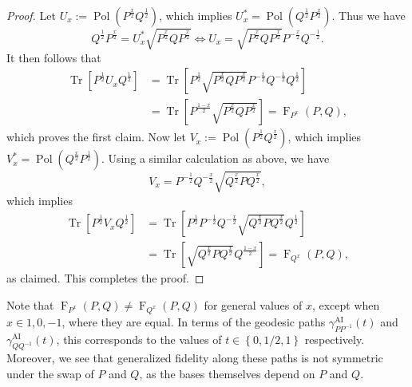 \documentclass[12pt]{article}
\theoremstyle{definition}
\newcommand{\Fg}[3]{\operatorname{F}_{#3}\!\left(#1, #2\right)}
\begin{document}
\begin{proof}
    Let $U_x := \operatorname{Pol}\left(P^\frac x2 Q ^{\frac12} \right)$, which implies $U_x^* = \operatorname{Pol}\left(Q ^{\frac12} P^\frac x2  \right)$. Thus we have
    \begin{equation}
        Q ^{\frac12} P^\frac{x}{2} = U_x^* \sqrt{P ^\frac x2 Q  P ^\frac x2} \iff U  _x  = \sqrt{P ^\frac x2 Q  P ^\frac x2  } P^{-\frac{x}{2}} Q ^{-\frac12}. 
    \end{equation}
   It then follows that
   \begin{equation}
    \begin{aligned}
       \operatorname{Tr}\left[P^{\frac12}  U_x Q ^{\frac12} \right] &= \operatorname{Tr}\left[P^{\frac12}  \sqrt{P ^\frac x2 Q  P ^\frac x2  } P^{-\frac{x}{2}} Q ^{-\frac12} Q ^{\frac12} \right] \\ &= \operatorname{Tr}\left[P^{\frac{1-x}2} \sqrt{P ^\frac x2 Q  P ^\frac x2} \right] = \Fg{P}{Q}{P^x},
    \end{aligned}
   \end{equation}
   which proves the first claim. Now let $V_x := \operatorname{Pol}\left(P^{\frac12}  Q^\frac{x}{2}\right)$, which implies $V_x^* = \operatorname{Pol}\left( Q^\frac x2 P^{\frac12} \right)$. Using a similar calculation as above, we have
    \begin{equation}
         V_x =  P ^{-\frac12} Q^{-\frac{x}2} \sqrt{Q^\frac x2 P Q^\frac x2} , 
    \end{equation}
    which implies
    \begin{equation}
    \begin{aligned}
        \operatorname{Tr}\left[P^{\frac12}  V_x Q ^{\frac12} \right] &= \operatorname{Tr}\left[P^{\frac12}  P ^{-\frac12} Q^{-\frac{x}2} \sqrt{Q^\frac x2 P Q^\frac x2} Q ^{\frac12}  \right] \\ 
        &= \operatorname{Tr}\left[ \sqrt{Q^\frac x2 P Q^\frac x2} Q ^{\frac{1-x}2}  \right] = \Fg{P}{Q}{Q^{x}},
    \end{aligned}
    \end{equation}
    as claimed. This completes the proof.
\end{proof}
Note that $\Fg{P}{Q}{P^x} \neq \Fg{P}{Q}{Q^x}$ for general values of $x$, except when $x \in {1, 0, -1}$, where they are equal. In terms of the geodesic paths $\gamma^{\text{AI}}_{P P ^{-1} }(t)$ and $\gamma^{\text{AI}}_{Q Q ^{-1} }(t)$, this corresponds to the values of $t \in \left\{0, 1/2, 1\right\}$ respectively. Moreover, we see that generalized fidelity along these paths is not symmetric under the swap of $P$ and $Q$, as the bases themselves depend on $P$ and $Q$. 
\end{document}
